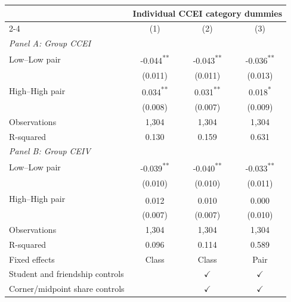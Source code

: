 \begin{tabular}{lccc}\toprule
& \multicolumn{3}{c}{Individual CCEI category dummies}\\
\cmidrule(lr){2-4}
& (1) & (2) & (3)\\\midrule
\multicolumn{4}{l}{\textit{Panel A: Group CCEI}}\\[3pt]
Low--Low pair & -0.044\textsuperscript{**} & -0.043\textsuperscript{**} & -0.036\textsuperscript{**}\\
 & (0.011) & (0.011) & (0.013)\\
High--High pair & 0.034\textsuperscript{**} & 0.031\textsuperscript{**} & 0.018\textsuperscript{*}\\
 & (0.008) & (0.007) & (0.009)\\
Observations & 1,304 & 1,304 & 1,304\\
R-squared & 0.130 & 0.159 & 0.631\\
\midrule
\multicolumn{4}{l}{\textit{Panel B: Group CEIV}}\\[3pt]
Low--Low pair & -0.039\textsuperscript{**} & -0.040\textsuperscript{**} & -0.033\textsuperscript{**}\\
 & (0.010) & (0.010) & (0.011)\\
High--High pair & 0.012\textsuperscript{} & 0.010\textsuperscript{} & 0.000\textsuperscript{}\\
 & (0.007) & (0.007) & (0.010)\\
Observations & 1,304 & 1,304 & 1,304\\
R-squared & 0.096 & 0.114 & 0.589\\
\midrule
Fixed effects & Class & Class & Pair\\
Student and friendship controls &  & $\checkmark$ & $\checkmark$\\
Corner/midpoint share controls &  & $\checkmark$ & $\checkmark$\\
\bottomrule\end{tabular}
